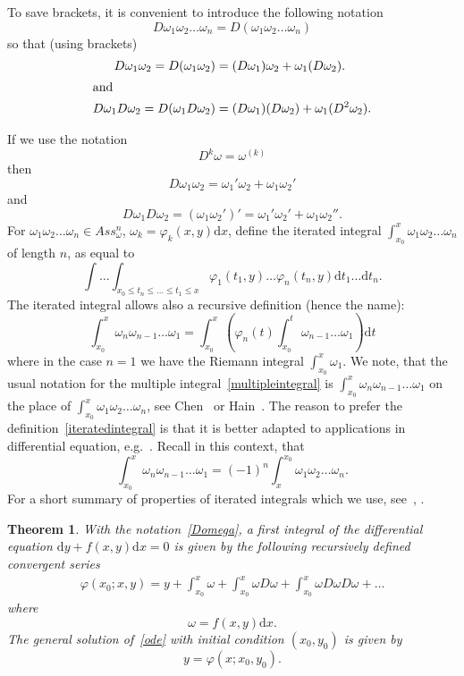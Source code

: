 \documentclass[11pt]{article}
\newtheorem{theo}{Theorem}[section]
\theoremstyle{definition}
\numberwithin{equation}{section}
\numberwithin{figure}{section}
\numberwithin{table}{section}
\newcommand*{\dd}{\mathrm{d}}
\newcommand*{\dx}{\dd x}
\newcommand*{\dy}{\dd y}
\newcommand*{\dt}{\dd t}
\begin{document}
To save brackets, it is convenient to introduce the following notation
\begin{equation}\label{Domega}
D\omega_1 \omega_2 \dots \omega_n = D(\omega_1 \omega_2 \dots \omega_n)
\end{equation}
so that (using brackets)
\begin{align*}
D \omega_1 \omega_2 =D (\omega_1 \omega_2) &= (D \omega_1) \omega_2 + \omega_1(D \omega_2).
\\
\intertext{and}
D \omega_1 D \omega_2 = D (\omega_1 D \omega_2) &= (D \omega_1)(D \omega_2) + \omega_1 (D^2 \omega_2).
\end{align*}

If we use the notation
\[
D^k\omega = \omega ^{(k)}
\]
then
\[
D \omega_1 \omega_2 = \omega_1' \omega_2+ \omega_1 \omega_2'
\]
and
\[
D \omega_1 D \omega_2 = (\omega_1 \omega_2')' = \omega_1' \omega_2' + \omega_1 \omega_2''.
\]
For $\omega_1\omega_2 \dots \omega_n \in Ass_\omega^n$, $\omega_k= \varphi_k(x,y) \dx$, define the iterated integral $\int_{x_0}^x \omega_1\omega_2 \dots \omega_n$ of length $n$, as equal to
\begin{equation}\label{multipleintegral}
\int \dots \int_{x_0 \leq t_n\leq \dots \leq t_1\leq x} \varphi_1(t_1,y) \dots \varphi_n(t_n,y) \dt_1 \dots \dt_n.
\end{equation}
The iterated integral allows also a recursive definition (hence the name):
\begin{equation}\label{iteratedintegral}
\int_{x_0}^x \omega_n\omega_{n-1} \dots \omega_1 = \int_{x_0}^x (\varphi_n (t) \int_{x_0}^t \omega_{n-1} \dots \omega_1)\dt
\end{equation}
where in the case $n=1$ we have the Riemann integral $\int_{x_0}^x \omega_{1}$. We note, that the usual notation for the multiple integral~\eqref{multipleintegral} is $\int_{x_0}^x \omega_n\omega_{n-1} \dots \omega_1$ on the place of $\int_{x_0}^x \omega_1\omega_2 \dots \omega_n$, see Chen~\cite{chen77} or Hain~\cite{hain87}. The reason to prefer the definition~\eqref{iteratedintegral} is that it is better adapted to applications in differential equation, e.g.~\cite{gavr05}. Recall in this context, that
\[
\int_{x_0}^x \omega_n\omega_{n-1} \dots \omega_1 = (-1)^n \int^{x_0}_x \omega_1\omega_2 \dots \omega_n.
\]
For a short summary of properties of iterated integrals which we use, see~\cite[Appendix]{gavr05}, \cite[Section~2]{gmn09}.


\begin{theo}\label{firstintegral}
With the notation~\eqref{Domega}, a first integral of the differential equation $\dy + f(x,y) \dx = 0$ is given by the following recursively defined convergent series
\begin{align}\label{first2}
\varphi(x_0;x,y) = y + \int_{x_0}^x \omega + \int_{x_0}^x \omega D \omega + \int_{x_0}^x \omega D \omega D \omega +
\dots 
\end{align}
where
\[
\omega = f(x,y) \dx.
\]
The general solution of~\eqref{ode} with initial condition $(x_0,y_0)$ is given by
\[
y= \varphi(x;x_0,y_0).
\]
\end{theo}
\end{document}
